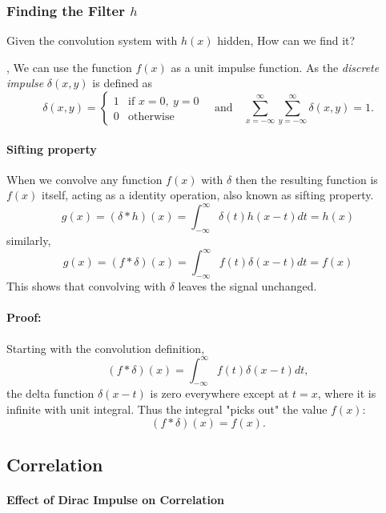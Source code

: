 \subsubsection{Finding the Filter $h$}
Given the convolution system with $h(x)$ hidden, How can we find it?

, We can use the function $f(x)$ as a unit impulse function. As the \emph{discrete impulse} $\delta(x, y)$ is defined as
$$
\delta(x, y) = 
\begin{cases}
1 & \text{if } x = 0,~y = 0 \\
0 & \text{otherwise}
\end{cases}
\quad \text{and} \quad \sum_{x =-\infty}^{\infty}\sum_{y = -\infty}^{\infty} \delta(x,y) = 1.
$$

\paragraph{Sifting property}When we convolve any function $f(x)$ with $\delta$ then the resulting function is $f(x)$ itself, acting as a identity operation, also known as sifting property. 
\[
    g(x) = (\delta*h)(x) = \int_{-\infty}^{\infty} \delta(t)h(x-t)dt = h(x)
\]
similarly,
\[
    g(x) = (f*\delta)(x) = \int_{-\infty}^{\infty} f(t)\delta(x-t)dt = f(x)
\]
This shows that convolving with \(\delta\) leaves the signal unchanged.

\paragraph{Proof:}
Starting with the convolution definition,
\[
(f * \delta)(x) = \int_{-\infty}^\infty f(t) \delta(x - t) dt,
\]
the delta function \(\delta(x - t)\) is zero everywhere except at \(t = x\), where it is infinite with unit integral. Thus the integral "picks out" the value \(f(x)\):
\[
(f * \delta)(x) = f(x).
\]

\subsection{Correlation}


\paragraph{Effect of Dirac Impulse on Correlation}

